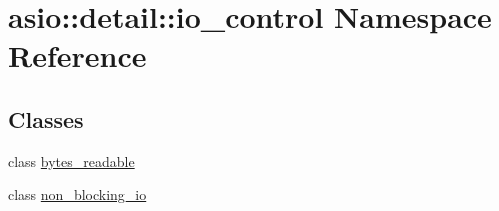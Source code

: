 \hypertarget{namespaceasio_1_1detail_1_1io__control}{}\section{asio\+:\+:detail\+:\+:io\+\_\+control Namespace Reference}
\label{namespaceasio_1_1detail_1_1io__control}
\subsection*{Classes}
\begin{DoxyCompactItemize}
\item 
class \hyperlink{classasio_1_1detail_1_1io__control_1_1bytes__readable}{bytes\+\_\+readable}
\item 
class \hyperlink{classasio_1_1detail_1_1io__control_1_1non__blocking__io}{non\+\_\+blocking\+\_\+io}
\end{DoxyCompactItemize}
